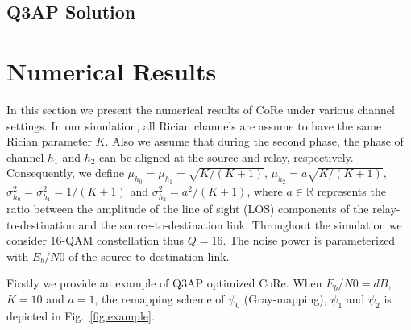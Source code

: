\documentclass[conference]{IEEEtran}
\begin{document}
\subsection{Q3AP Solution}

\section{Numerical Results}
\label{sec:simulation}
In this section we present the numerical results of CoRe under various channel
settings. In our simulation, all Rician channels are assume to have the same
Rician parameter $K$. Also we assume that during the second phase, the phase of
channel $h_1$ and $h_2$ can be aligned at the source and relay, respectively.
Consequently, we define $\mu_{h_0} = \mu_{h_1} = \sqrt{K/(K + 1)}$,
$\mu_{h_2}=a\sqrt{K/(K + 1)}$,  $\sigma_{h_0}^2 = \sigma_{h_1}^2 = 1/(K+1)$ and
$\sigma_{h_2}^2 = a^2/(K+1)$, where $a\in \mathbb{R}$ represents the ratio
between the amplitude of the line of sight (LOS) components of the
relay-to-destination and the source-to-destination link. Throughout the
simulation we consider 16-QAM constellation thus $Q=16$. The noise power is
parameterized with $E_b/N0$ of the source-to-destination link.

Firstly we provide an example of Q3AP optimized CoRe. When $E_b/N0 = dB$, $K =
10$ and $a = 1$, the remapping scheme of $\psi_0$ (Gray-mapping), $\psi_1$ and
$\psi_2$ is depicted in Fig.~\ref{fig:example}.
\end{document}
